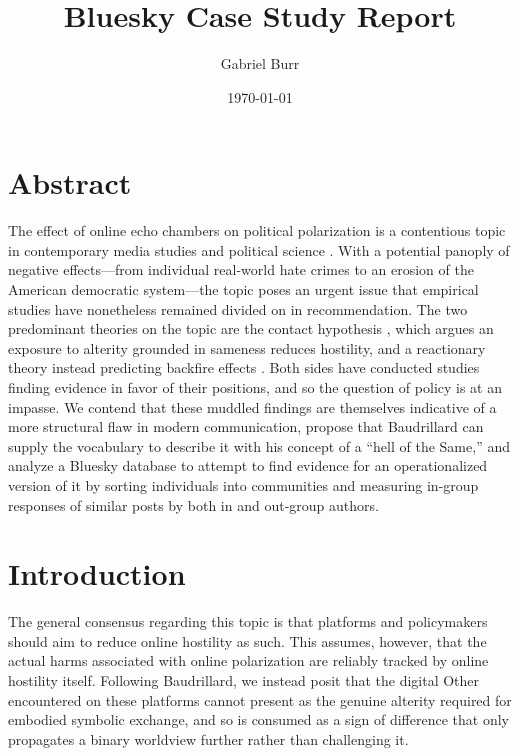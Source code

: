 \documentclass[11pt]{article}   %
\title{Bluesky Case Study Report}
\author{Gabriel Burr}
\date{\today}
\begin{document}
\maketitle

\section{Abstract}
The effect of online echo chambers on political polarization is a contentious topic in contemporary media studies and political science \parencite{Cinelli2021}.
With a potential panoply of negative effects—from individual real-world hate crimes to an erosion of the American democratic system—the topic poses an urgent issue that empirical studies have nonetheless remained divided on in recommendation. The two predominant theories on the topic are the
contact hypothesis \parencite{Allport1979}, which argues an exposure to alterity grounded in sameness reduces hostility, and a reactionary theory instead predicting backfire effects \parencite{Bail2018}. 
Both sides have conducted studies finding evidence in favor of their positions, and so the question of policy is at an impasse. We contend that these muddled findings are themselves indicative 
of a more structural flaw in modern communication, propose that Baudrillard can supply the vocabulary to describe it with his concept of a ``hell of the Same,'' 
and analyze a Bluesky database to attempt to find evidence for an operationalized version of it by sorting individuals into communities and measuring in-group responses of similar posts by both in and out-group authors.

\section{Introduction}\label{sec:introduction}
The general consensus regarding this topic is that platforms and policymakers should aim to reduce online hostility as such. This assumes, 
however, that the actual harms associated with online polarization are reliably tracked by online hostility itself. Following Baudrillard, we instead posit that the digital 
Other encountered on these platforms  cannot present as the genuine alterity required for embodied symbolic exchange, and so is consumed as a sign of difference that 
only propagates a binary worldview further rather than challenging it.
\end{document}
